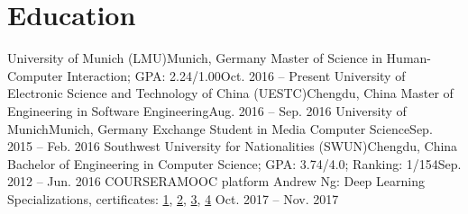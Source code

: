 \section{\textbf{Education}}
  \resumeSubHeadingListStart
    \resumeSubheading
      {University of Munich (LMU)}{Munich, Germany}
      {Master of Science in Human-Computer Interaction; GPA: 2.24/1.00}{Oct. 2016 -- Present}
    \resumeSubheading
      {University of Electronic Science and Technology of China (UESTC)}{Chengdu, China}
      {Master of Engineering in Software Engineering}{Aug. 2016 -- Sep. 2016}
    \resumeSubheading
      {University of Munich}{Munich, Germany}
      {Exchange Student in Media Computer Science}{Sep. 2015 -- Feb. 2016}
    \resumeSubheading
      {Southwest University for Nationalities (SWUN)}{Chengdu, China}
      {Bachelor of Engineering in Computer Science;  GPA: 3.74/4.0; Ranking: 1/154}{Sep. 2012 -- Jun. 2016}
    \resumeSubheading
      {COURSERA}{MOOC platform}
      {Andrew Ng: Deep Learning Specializations, certificates:
       \href{https://www.coursera.org/account/accomplishments/verify/YH4NT7HHN263}{1}, 
       \href{https://www.coursera.org/account/accomplishments/verify/QGH3GNGF6BM4}{2}, 
       \href{https://www.coursera.org/account/accomplishments/verify/6VU45R2SZEF6}{3},
       \href{https://www.coursera.org/account/accomplishments/verify/LF3K9BQQDLVL}{4}}
      {Oct. 2017 -- Nov. 2017}
  \resumeSubHeadingListEnd